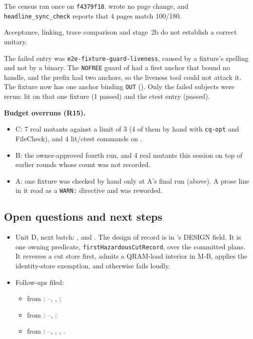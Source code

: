 The census ran once on \texttt{f4379f18}.  wrote no page change, and \texttt{headline\_sync\_check} reports that 4 pages match 100/180.

Acceptance, linking, trace comparison and stage~2b do not establish a correct unitary.

The failed entry was \texttt{e2e-fixture-guard-liveness}, caused by a fixture's spelling and not by a binary. The \texttt{NOFREE} guard of  had a first anchor that bound no handle, and the prefix had two anchors, so the liveness tool could not attack it. The fixture now has one anchor binding \texttt{OUT} (). Only the failed subjects were rerun: lit on that one fixture (1 passed) and the ctest entry (passed).

\textbf{Budget overruns (R15).}
\begin{itemize}
\item C: 7 real mutants against a limit of 3 (4 of them by hand with \texttt{cq-opt} and FileCheck), and 4 lit/ctest commands on .
\item B: the owner-approved fourth run, and 4 real mutants this session on top of earlier rounds whose count was not recorded.
\item A: one fixture was checked by hand only at A's final run (above). A prose line in it read as a \texttt{WARN:} directive and was reworded.
\end{itemize}

\subsection*{Open questions and next steps}
\begin{itemize}
\item Unit D, next batch: ,  and . The design of record is in 's DESIGN field. It is one owning predicate, \texttt{firstHazardousCutRecord}, over the committed plans. It reverses a cut store first, admits a QRAM-load interior in M-B, applies the identity-store exemption, and otherwise fails loudly.
\item Follow-ups filed:
  \begin{itemize}
  \item from : --, , ;
  \item from : --, ;
  \item from : --, , , .
  \end{itemize}
\end{itemize}

